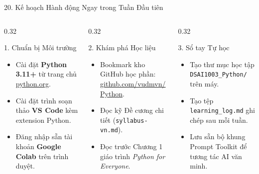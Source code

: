 \documentclass[aspectratio=169, 10pt]{beamer}
\begin{document}
\begin{frame}{20. Kế hoạch Hành động Ngay trong Tuần Đầu tiên}
  \begin{columns}[T]
    \begin{column}{0.32\textwidth}
      \begin{cbox}[primaryblue]{1. Chuẩn bị Môi trường}
        \scriptsize
        \begin{itemize}\setlength{\itemsep}{2pt}
          \item Cài đặt \textbf{Python 3.11+} từ trang chủ \url{python.org}.
          \item Cài đặt trình soạn thảo \textbf{VS Code} kèm extension Python.
          \item Đăng nhập sẵn tài khoản \textbf{Google Colab} trên trình duyệt.
        \end{itemize}
      \end{cbox}
    \end{column}
    \begin{column}{0.32\textwidth}
      \begin{cbox}[secondarygreen]{2. Khám phá Học liệu}
        \scriptsize
        \begin{itemize}\setlength{\itemsep}{2pt}
          \item Bookmark kho GitHub học phần: \url{github.com/vudmvn/Python}.
          \item Đọc kỹ Đề cương chi tiết (\texttt{syllabus-vn.md}).
          \item Đọc trước Chương 1 giáo trình \textit{Python for Everyone}.
        \end{itemize}
      \end{cbox}
    \end{column}
    \begin{column}{0.32\textwidth}
      \begin{cbox}[accentorange]{3. Sổ tay Tự học}
        \scriptsize
        \begin{itemize}\setlength{\itemsep}{2pt}
          \item Tạo thư mục học tập \texttt{DSAI1003\_Python/} trên máy.
          \item Tạo tệp \texttt{learning\_log.md} ghi chép sau mỗi tuần.
          \item Lưu sẵn bộ khung Prompt Toolkit để tương tác AI văn minh.
        \end{itemize}

\end{cbox}
\end{column}
\end{columns}
\end{frame}
\end{document}
